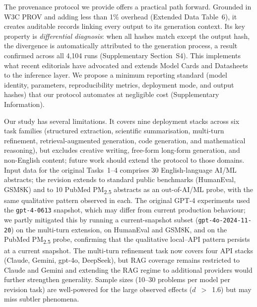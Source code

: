 \documentclass[sn-nature]{sn-jnl}
\begin{document}
The provenance protocol we provide offers a practical path forward.
Grounded in W3C PROV\cite{w3cprov2013} and adding less than 1\% overhead (Extended Data Table~6), it creates auditable records linking every output to its generation context.
Its key property is \emph{differential diagnosis}: when all hashes match except the output hash, the divergence is automatically attributed to the generation process, a result confirmed across all 4,104 runs (Supplementary Section~S4).
This implements what recent editorials have advocated\cite{editorial2024framework} and extends Model Cards\cite{mitchell2019model} and Datasheets\cite{gebru2021datasheets} to the inference layer.
We propose a minimum reporting standard (model identity, parameters, reproducibility metrics, deployment mode, and output hashes) that our protocol automates at negligible cost (Supplementary Information).

Our study has several limitations.
It covers nine deployment stacks across six task families (structured extraction, scientific summarisation, multi-turn refinement, retrieval-augmented generation, code generation, and mathematical reasoning), but excludes creative writing, free-form long-form generation, and non-English content; future work should extend the protocol to those domains.
Input data for the original Tasks~1--4 comprises 30 English-language AI/ML abstracts; the revision extends to standard public benchmarks (HumanEval, GSM8K) and to 10 PubMed PM\textsubscript{2.5} abstracts as an out-of-AI/ML probe, with the same qualitative pattern observed in each.
The original GPT-4 experiments used the \texttt{gpt-4-0613} snapshot, which may differ from current production behaviour; we partly mitigated this by running a current-snapshot subset (\texttt{gpt-4o-2024-11-20}) on the multi-turn extension, on HumanEval and GSM8K, and on the PubMed PM\textsubscript{2.5} probe, confirming that the qualitative local--API pattern persists at a current snapshot.
The multi-turn refinement task now covers four API stacks (Claude, Gemini, gpt-4o, DeepSeek), but RAG coverage remains restricted to Claude and Gemini and extending the RAG regime to additional providers would further strengthen generality.
Sample sizes (10--30 problems per model per revision task) are well-powered for the large observed effects ($d$~$>$~1.6) but may miss subtler phenomena.
\end{document}
